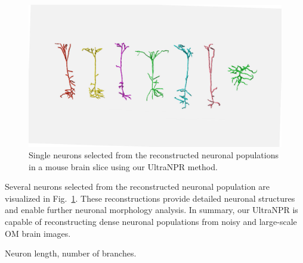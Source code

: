 \begin{figure}[t]
	\centering
	\includegraphics[width=1\columnwidth]{./Illustrations/single_neurons4.pdf}
	\caption{Single neurons selected from the reconstructed neuronal populations in a mouse brain slice using our UltraNPR method.}
	\label{fig:single_neurons}
\end{figure}


Several neurons selected from the reconstructed neuronal population are visualized in Fig.~\ref{fig:single_neurons}. These reconstructions provide detailed neuronal structures and enable further neuronal morphology analysis. 
In summary, our UltraNPR is capable of reconstructing dense neuronal populations from noisy and large-scale OM brain images.

Neuron length, number of branches.

